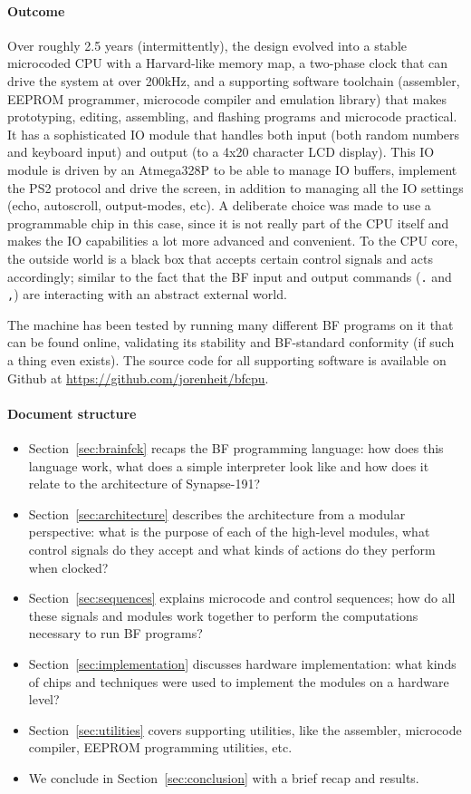 \paragraph{Outcome}
Over roughly 2.5 years (intermittently), the design evolved into a stable microcoded CPU with a Harvard-like memory map, a two-phase clock that can drive the system at over 200kHz, and a supporting software toolchain (assembler, EEPROM programmer, microcode compiler and emulation library) that makes prototyping, editing, assembling, and flashing programs and microcode practical. It has a sophisticated IO module that handles both input (both random numbers and keyboard input) and output (to a 4x20 character LCD display). This IO module is driven by an Atmega328P to be able to manage IO buffers, implement the PS2 protocol and drive the screen, in addition to managing all the IO settings (echo, autoscroll, output-modes, etc). A deliberate choice was made to use a programmable chip in this case, since it is not really part of the CPU itself and makes the IO capabilities a lot more advanced and convenient. To the CPU core, the outside world is a black box that accepts certain control signals and acts accordingly; similar to the fact that the BF input and output commands (\texttt{.} and \texttt{,}) are interacting with an abstract external world.

The machine has been tested by running many different BF programs on it that can be found online, validating its stability and BF-standard conformity (if such a thing even exists). The source code for all supporting software is available on Github at \url{https://github.com/jorenheit/bfcpu}.

\paragraph{Document structure}
\begin{itemize} \setlength\itemsep{0em}
  \item Section~\ref{sec:brainfck} recaps the BF programming language: how does this language work, what does a simple interpreter look like and how does it relate to the architecture of Synapse-191?
  \item Section~\ref{sec:architecture} describes the architecture from a modular perspective: what is the purpose of each of the high-level modules, what control signals do they accept and what kinds of actions do they perform when clocked?
  \item Section~\ref{sec:sequences} explains microcode and control sequences; how do all these signals and modules work together to perform the computations necessary to run BF programs?
  \item Section~\ref{sec:implementation} discusses hardware implementation: what kinds of chips and techniques were used to implement the modules on a hardware level?
  \item Section~\ref{sec:utilities} covers supporting utilities, like the assembler, microcode compiler, EEPROM programming utilities, etc. 
  \item We conclude in Section~\ref{sec:conclusion} with a brief recap and results.
\end{itemize}
